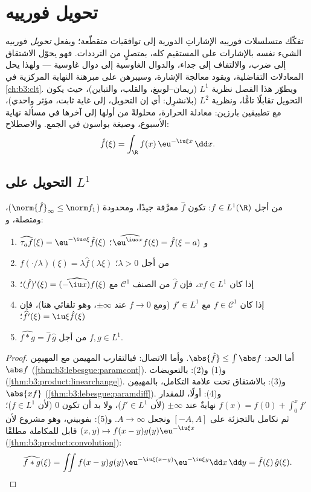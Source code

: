 \chapter{تحويل فورييه}\label{ch:b3:fouriertransform}

تفكّك متسلسلات فورييه الإشاراتِ الدورية إلى توافقيات متقطّعة؛
ويفعل \emph{تحويل} فورييه الشيء نفسه بالإشارات على المستقيم
كله، بمتصلٍ من الترددات. فهو يحوّل الاشتقاق إلى ضرب، والالتفاف
إلى جداء، والدوال الغاوسية إلى دوال غاوسية --- ولهذا يحل
المعادلات التفاضلية، ويقود معالجة الإشارة، وسيبرهن على مبرهنة
النهاية المركزية في \cref{ch:b3:clt}. ويطوّر هذا الفصل نظرية $L^1$
(ريمان--لوبيغ، والقلب، والتباين)،  حيث يكون التحويل
تقابلًا تامًّا، ونظرية $L^2$ (بلانشرِل: أي إن التحويل، إلى غاية
ثابت، مؤثر واحدي)، مع تطبيقين بارزين: معادلة الحرارة، محلولةً
من أولها إلى آخرها في مسألة نهاية الأسبوع، وصيغة بواسون في
الجمع. والاصطلاح:
\[
\hat f(\xi) = \int_\R f(x)\,\eu^{-\iu\xi x}\,\dd x .
\]

\section{التحويل على \texorpdfstring{$L^1$}{L1}}

\begin{proposition}\label{prop:b3:fouriertransform:basic}
من أجل $f \in L^1(\R)$: تكون $\hat f$ معرَّفة جيدًا، ومحدودة
($\norm{\hat f}_\infty \leq \norm f_1$)، ومتصلة، و:
\begin{enumerate}
  \item $\widehat{\tau_af}(\xi) = \eu^{-\iu a\xi}\hat f(\xi)$ و $\widehat{\eu^{\iu ax}f}(\xi) = \hat f(\xi - a)$؛
  \item $\widehat{f(\cdot/\lambda)}(\xi) = \lambda\hat
        f(\lambda\xi)$ من أجل $\lambda > 0$؛
  \item إذا كان $xf \in L^1$، فإن $\hat f$ من الصنف
        $\mathcal C^1$ مع $(\hat f)'(\xi) = \widehat{(-\iu x)f}(\xi)$؛
  \item إذا كان $f \in \mathcal C^1$ مع $f' \in L^1$ (ومع $f \to
        0$ عند
        $\pm\infty$، وهو تلقائي هنا)، فإن $\widehat{f'}(\xi) = \iu\xi\hat f(\xi)$؛
  \item $\widehat{f * g} = \hat f\,\hat g$ من أجل $f, g \in L^1$.
\end{enumerate}
\end{proposition}

\begin{proof}
أما الحد: $\abs{\hat f} \leq \int\abs f$. وأما الاتصال: فبالتقارب المهيمن مع المهيمِن
$\abs f$ (\cref{thm:b3:lebesgue:paramcont}). و(1) و(2): بالتعويضات (\cref{thm:b3:product:linearchange}).
و(3): بالاشتقاق تحت علامة التكامل، بالمهيمِن $\abs{xf}$
(\cref{thm:b3:lebesgue:paramdiff}). و(4): أولًا، للمقدار $f(x) = f(0)
+ \int_0^xf'$ نهايةٌ عند $\pm\infty$
(لأن $f' \in L^1$)، ولا بد أن تكون $0$ (لأن $f \in L^1$)؛ ثم
نكامل بالتجزئة على $[-A,
A]$ ونجعل $A \to \infty$. و(5): بفوبيني،
وهو مشروع لأن $(x,y)\mapsto f(x - y)g(y)\eu^{-\iu\xi x}$ قابل للمكاملة مطلقًا (\cref{thm:b3:product:convolution}):
\[
\widehat{f*g}(\xi) = \iint f(x - y)g(y)\eu^{-\iu\xi(x - y)}
\eu^{-\iu\xi y}\dd x\,\dd y = \hat f(\xi)\,\hat g(\xi).
\]
\end{proof}

